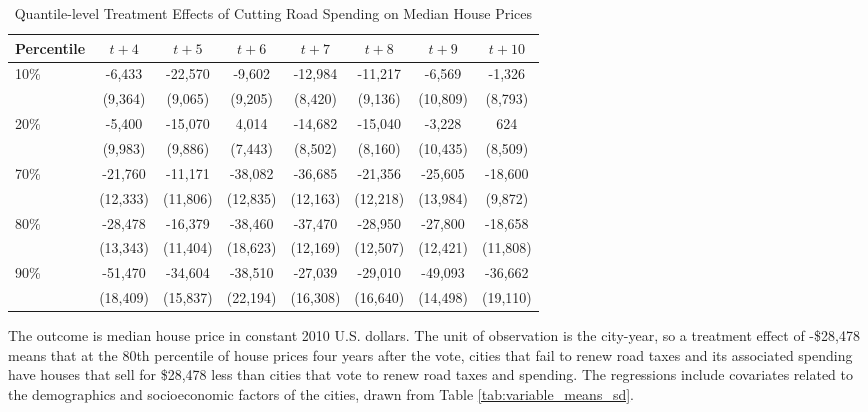 \begin{table}[ht]
    \hspace{-1cm}
    \caption{Quantile-level Treatment Effects of Cutting Road Spending on Median House Prices}
    \label{tab:quantile_tes}
    \begin{tabular}{p{1.5cm}ccccccc}
        \hline
        Percentile & $t + 4$ & $t + 5$ & $t + 6$ & $t + 7$ & $t + 8$ & $t + 9$ & $t + 10$ \\
        \hline
        10\% & -6,433 & -22,570 & -9,602 & -12,984 & -11,217 & -6,569 & -1,326 \\
        & (9,364) & (9,065) & (9,205) & (8,420) & (9,136) & (10,809) & (8,793) \\
        20\% & -5,400 & -15,070 & 4,014 & -14,682 & -15,040 & -3,228 & 624 \\
        & (9,983) & (9,886) & (7,443) & (8,502) & (8,160) & (10,435) & (8,509) \\
        70\% & -21,760 & -11,171 & -38,082 & -36,685 & -21,356 & -25,605 & -18,600 \\
        & (12,333) & (11,806) & (12,835) & (12,163) & (12,218) & (13,984) & (9,872) \\
        80\% & -28,478 & -16,379 & -38,460 & -37,470 & -28,950 & -27,800 & -18,658 \\
        & (13,343) & (11,404) & (18,623) & (12,169) & (12,507) & (12,421) & (11,808) \\
        90\% & -51,470 & -34,604 & -38,510 & -27,039 & -29,010 & -49,093 & -36,662 \\
        & (18,409) & (15,837) & (22,194) & (16,308) & (16,640) & (14,498) & (19,110) \\
        \hline
    \end{tabular}
    \begin{tablenotes}
        \small
        \item The outcome is median house price in constant 2010 U.S. dollars. The unit of observation is the city-year, so a treatment effect of -\$28,478 means that at the 80th percentile of house prices four years after the vote, cities that fail to renew road taxes and its associated spending have houses that sell for \$28,478 less than cities that vote to renew road taxes and spending. The regressions include covariates related to the demographics and socioeconomic factors of the cities, drawn from Table \ref{tab:variable_means_sd}.
    \end{tablenotes}
\end{table}

